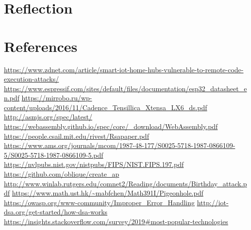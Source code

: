 \documentclass{article}
\begin{document}
\section{Reflection}


\section{References}
\begin{thebibliography}{9}
  \url{https://www.zdnet.com/article/smart-iot-home-hubs-vulnerable-to-remote-code-execution-attacks/}
	\url{https://www.espressif.com/sites/default/files/documentation/esp32_datasheet_en.pdf}
	\url{https://mirrobo.ru/wp-content/uploads/2016/11/Cadence_Tensillica_Xtensa_LX6_ds.pdf}
	\url{http://asmjs.org/spec/latest/}
	\url{https://webassembly.github.io/spec/core/_download/WebAssembly.pdf}
	\url{https://people.csail.mit.edu/rivest/Rsapaper.pdf}
	\url{https://www.ams.org/journals/mcom/1987-48-177/S0025-5718-1987-0866109-5/S0025-5718-1987-0866109-5.pdf}
	\url{https://nvlpubs.nist.gov/nistpubs/FIPS/NIST.FIPS.197.pdf}
	\url{https://github.com/oblique/create_ap}
	\url{http://www.winlab.rutgers.edu/comnet2/Reading/documents/Birthday_attack.pdf}
	\url{https://www.math.ust.hk/~mabfchen/Math391I/Pigeonhole.pdf}
  \url{https://owasp.org/www-community/Improper_Error_Handling}
  \url{http://iot-dsa.org/get-started/how-dsa-works}
  \url{https://insights.stackoverflow.com/survey/2019#most-popular-technologies}
\end{thebibliography}
\end{document}
